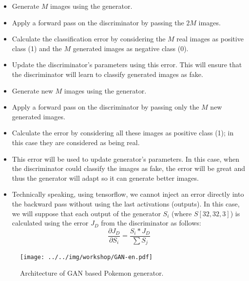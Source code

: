 \documentclass[11pt, a4paper]{article}
\begin{document}
\begin{itemize}
	\item Generate $ M $ images using the generator.
	\item Apply a forward pass on the discriminator by passing the $ 2M $ images.
	\item Calculate the classification error by considering the $ M $ real images as positive class (1) and the $ M $ generated images as negative class (0). 
	\item Update the discriminator's parameters using this error. This will ensure that the discriminator will learn to classify generated images as fake.
	\item Generate new $ M $ images using the generator.
	\item Apply a forward pass on the discriminator by passing only the $ M $ new generated images.
	\item Calculate the error by considering all these images as positive class (1); in this case they are considered as being real.
	\item This error will be used to update generator's parameters. In this case, when the discriminator could classify the images as fake, the error will be great and thus the generator will adapt so it can generate better images.
	\item Technically speaking, using tensorflow, we cannot inject an error directly into the backward pass without using the last activations (outputs).
	In this case, we will suppose that each output of the generator $S_i$ (where $S[32, 32, 3]$) is calculated using the error $J_D$ from the discriminator as follows:
	\[\frac{\partial J_D}{\partial S_i} = \frac{S_i * J_D}{\sum S_j}\]
	
\end{itemize}

\begin{figure}[htp]
	\centering
	\texttt{[image: ../../img/workshop/GAN-en.pdf]}
	\caption{Architecture of GAN based Pokemon generator.}
	\label{fig:gen-gan}
\end{figure}
\end{document}
